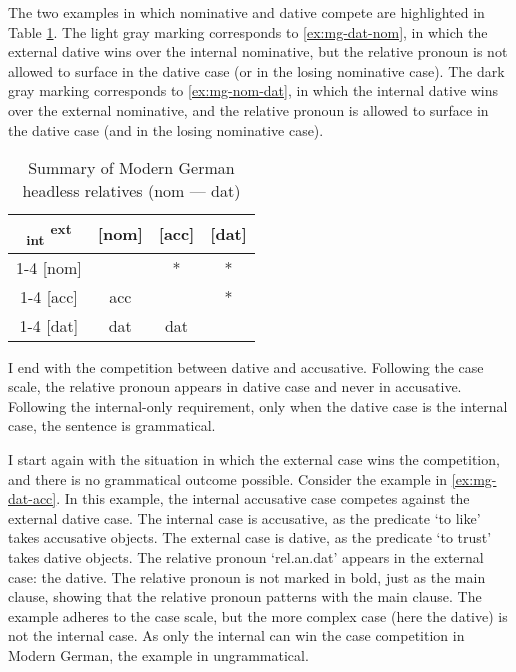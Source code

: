 The two examples in which nominative and dative compete are highlighted in Table \ref{tbl:case-competition-mg-nom-dat}. The light gray marking corresponds to \ref{ex:mg-dat-nom}, in which the external dative wins over the internal nominative, but the relative pronoun is not allowed to surface in the dative case (or in the losing nominative case). The dark gray marking corresponds to \ref{ex:mg-nom-dat}, in which the internal dative wins over the external nominative, and the relative pronoun is allowed to surface in the dative case (and in the losing nominative case).

\begin{table}[H]
  \center
  \caption{Summary of Modern German headless relatives (\ac{nom} --- \ac{dat})}
  \begin{tabular}{c|c|c|c}
    \toprule
    \textsubscript{\ac{int}} \textsuperscript{\ac{ext}}
           & [\ac{nom}]
           & [\ac{acc}]
           & [\ac{dat}]
           \\ \cmidrule{1-4}
       [\ac{nom}]
           & \xcancel{\phantom{xx}}
           & *
           & \cellcolor{LG}*
           \\ \cmidrule{1-4}
       [\ac{acc}]
           & \ac{acc}
           & \xcancel{\phantom{xx}}
           & *
           \\ \cmidrule{1-4}
       [\ac{dat}]
           & \cellcolor{DG}\ac{dat}
           & \ac{dat}
           & \xcancel{\phantom{xx}}
           \\
     \bottomrule
  \end{tabular}
    \label{tbl:case-competition-mg-nom-dat}
\end{table}

I end with the competition between dative and accusative. Following the case scale, the relative pronoun appears in dative case and never in accusative. Following the internal-only requirement, only when the dative case is the internal case, the sentence is grammatical.

I start again with the situation in which the external case wins the competition, and there is no grammatical outcome possible.
Consider the example in \ref{ex:mg-dat-acc}. In this example, the internal accusative case competes against the external dative case.
The internal case is accusative, as the predicate  `to like' takes accusative objects.
The external case is dative, as the predicate  `to trust' takes dative objects.
The relative pronoun  `\ac{rel}.\ac{an}.\ac{dat}' appears in the external case: the dative. The relative pronoun is not marked in bold, just as the main clause, showing that the relative pronoun patterns with the main clause.
The example adheres to the case scale, but the more complex case (here the dative) is not the internal case. As only the internal can win the case competition in Modern German, the example in ungrammatical.

